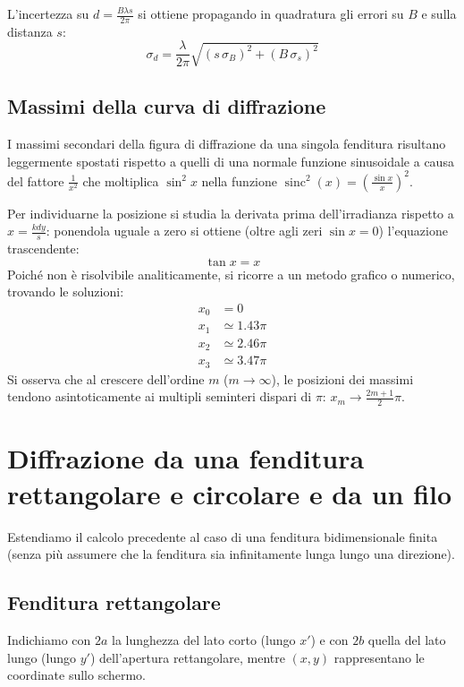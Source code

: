 \documentclass[openany,a4paper,12pt]{book}
\begin{document}
L'incertezza su $d = \frac{B \lambda s}{2\pi}$ si ottiene propagando in quadratura gli errori su $B$ e sulla distanza $s$:
\[
    \sigma_d = \frac{\lambda}{2\pi} \sqrt{(s\,\sigma_B)^2 + (B\,\sigma_s)^2}
\]


\subsection*{Massimi della curva di diffrazione}

I massimi secondari della figura di diffrazione da una singola fenditura risultano leggermente spostati rispetto a quelli di una normale funzione sinusoidale a causa del fattore $\frac{1}{x^2}$ che moltiplica $\sin^2 x$ nella funzione $\operatorname{sinc}^2(x) = \left(\frac{\sin x}{x}\right)^2$.

Per individuarne la posizione si studia la derivata prima dell'irradianza rispetto a $x = \frac{kdy}{s}$: ponendola uguale a zero si ottiene (oltre agli zeri $\sin x = 0$) l'equazione trascendente:
\[
    \tan x = x
\]
Poiché non è risolvibile analiticamente, si ricorre a un metodo grafico o numerico, trovando le soluzioni:
\begin{align*}
    x_0 &= 0 \\
    x_1 &\simeq \num{1.43}\pi \\
    x_2 &\simeq \num{2.46}\pi \\
    x_3 &\simeq \num{3.47}\pi
\end{align*}
Si osserva che al crescere dell'ordine $m$ ($m \to \infty$), le posizioni dei massimi tendono asintoticamente ai multipli seminteri dispari di $\pi$: $x_m \to \frac{2m+1}{2}\pi$.

\section{Diffrazione da una fenditura rettangolare e circolare e da un filo}

Estendiamo il calcolo precedente al caso di una fenditura bidimensionale finita (senza più assumere che la fenditura sia infinitamente lunga lungo una direzione).

\subsection*{Fenditura rettangolare}

Indichiamo con $2a$ la lunghezza del lato corto (lungo $x'$) e con $2b$ quella del lato lungo (lungo $y'$) dell'apertura rettangolare, mentre $(x, y)$ rappresentano le coordinate sullo schermo.
\end{document}
